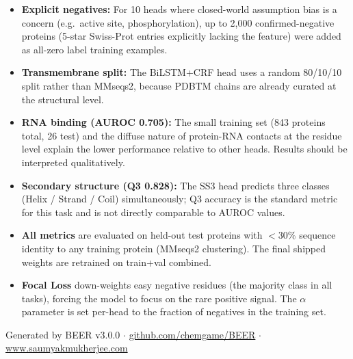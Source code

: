 \documentclass[11pt,a4paper]{article}
\begin{document}
\begin{itemize}[leftmargin=1.5em]
  \item \textbf{Explicit negatives:} For 10 heads where closed-world assumption bias is a concern (e.g.\ active site, phosphorylation), up to 2,000 confirmed-negative proteins (5-star Swiss-Prot entries explicitly lacking the feature) were added as all-zero label training examples.
  \item \textbf{Transmembrane split:} The BiLSTM+CRF head uses a random 80/10/10 split rather than MMseqs2, because PDBTM chains are already curated at the structural level.
  \item \textbf{RNA binding (AUROC 0.705):} The small training set (843 proteins total, 26 test) and the diffuse nature of protein-RNA contacts at the residue level explain the lower performance relative to other heads. Results should be interpreted qualitatively.
  \item \textbf{Secondary structure (Q3 0.828):} The SS3 head predicts three classes (Helix / Strand / Coil) simultaneously; Q3 accuracy is the standard metric for this task and is not directly comparable to AUROC values.
  \item \textbf{All metrics} are evaluated on held-out test proteins with $<$30\% sequence identity to any training protein (MMseqs2 clustering). The final shipped weights are retrained on train+val combined.
  \item \textbf{Focal Loss} down-weights easy negative residues (the majority class in all tasks), forcing the model to focus on the rare positive signal. The $\alpha$ parameter is set per-head to the fraction of negatives in the training set.
\end{itemize}

\vspace{12pt}
\noindent\small\color{gray}
Generated by BEER v3.0.0 $\cdot$
\href{https://github.com/chemgame/BEER}{github.com/chemgame/BEER} $\cdot$
\href{https://www.saumyakmukherjee.com}{www.saumyakmukherjee.com}
\end{document}
